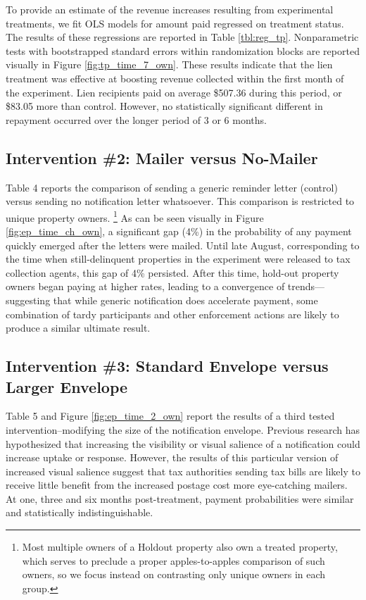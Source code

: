 \documentclass[12pt,titlepage]{article}
\begin{document}
To provide an estimate of the revenue increases resulting from experimental 
treatments, we fit OLS models for amount paid regressed on treatment status.
The results of these regressions are reported in 
Table \ref{tbl:reg_tp}. Nonparametric tests with bootstrapped standard errors within 
randomization blocks are reported visually in Figure \ref{fig:tp_time_7_own}. 
These results indicate that the lien treatment was effective at boosting 
revenue collected within the first month of the experiment. Lien recipients 
paid on average \$507.36 during this period, or \$83.05 more than control. However, no statistically 
significant different in repayment occurred over the longer period of 3 or 6 months.


\subsection{Intervention \#2: Mailer versus No-Mailer}

Table 4 reports the comparison of sending a generic reminder letter 
(control) versus sending no notification letter whatsoever. This 
comparison is restricted to unique property owners.
\footnote{
	Most multiple owners of a Holdout property also own a treated property, which
	serves to preclude a proper apples-to-apples comparison of such owners, so
	we focus instead on contrasting only unique owners in each group.
}
As can be seen visually in Figure \ref{fig:ep_time_ch_own}, 
a significant gap (4\%) in the probability 
of any payment quickly emerged after the letters were mailed. Until 
late August, corresponding to the time when still-delinquent properties 
in the experiment were released to tax collection agents, this gap of 
4\% persisted. After this time, hold-out property owners began paying 
at higher rates, leading to a convergence of trends—suggesting that 
while generic notification does accelerate payment, some
combination of tardy participants and other enforcement actions are 
likely to produce a similar ultimate result. 

\subsection{Intervention \#3: Standard Envelope versus Larger Envelope}

Table 5 and Figure \ref{fig:ep_time_2_own} report the results of a third tested
intervention--modifying the size of the notification envelope.
Previous research has hypothesized that increasing the visibility or visual 
salience of a notification could increase uptake or response.
However, the results of this particular version of increased visual salience 
suggest that tax authorities sending tax bills are likely to receive little 
benefit from the increased postage cost more eye-catching mailers. 
At one, three and six months post-treatment, payment probabilities 
were similar and statistically indistinguishable. 
\end{document}
